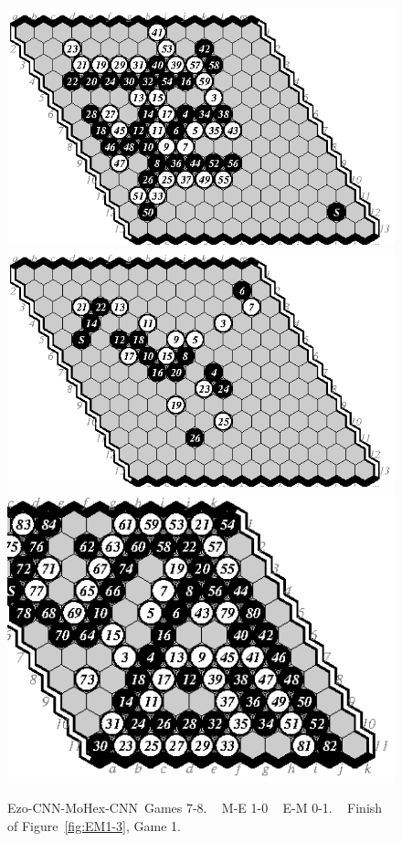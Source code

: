 \documentclass{icga}
\def\Ec{\mbox{\sc Ezo-CNN}}
\def\Mc{\mbox{\sc MoHex-CNN}}
\begin{document}
\begin{figure}[hbp]
\noindent\includegraphics[scale=.9]{pix/13.me7.eps}\hspace*{-2cm}
\includegraphics[scale=.9]{pix/13.em8.eps}\hspace*{-1cm}
\includegraphics[scale=.9]{pix/11.em1end.eps}
\caption{\Ec{}-\Mc\ Games 7-8. ~ M-E 1-0 ~ E-M 0-1. ~ Finish of Figure~\ref{fig:EM1-3}, Game 1.}
\label{fig:sol}
\end{figure}
\fi
\end{document}
